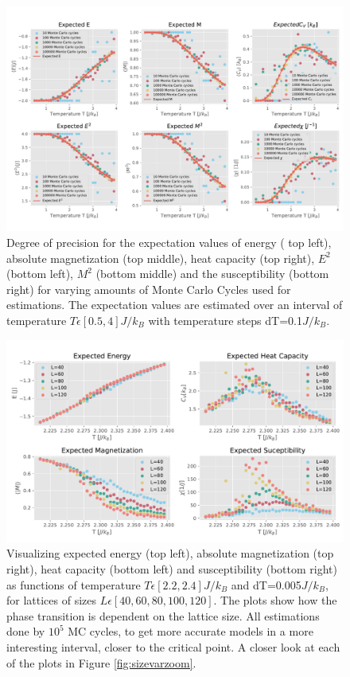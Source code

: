 \documentclass[10pt, nofootinbib, twocolumn]{revtex4-1}
\begin{document}
\begin{figure}\label{fig:all}
    \centering
    \includegraphics[width = 1\textwidth]{figures/mcc_comp_all.pdf} 
    \caption{Degree of precision for the expectation values of energy ( top left), absolute magnetization (top middle), heat capacity (top right), $E^2$ (bottom left), $M^2$ (bottom middle) and the susceptibility (bottom right) for varying amounts of Monte Carlo Cycles used for estimations. The expectation values are estimated over an interval of temperature $T\epsilon [0.5,4]J/k_B$ with temperature steps dT=0.1$J/k_B$.}
    \label{fig:all}
\end{figure} 

\begin{figure}
    \centering
    \includegraphics[width = 1\textwidth]{figures/sizevariationszoom4.pdf} 
    \caption{Visualizing expected energy (top left), absolute magnetization (top right), heat capacity (bottom left) and susceptibility (bottom right) as functions of temperature $T\epsilon [2.2,2.4]J/k_B$ and dT=0.005$J/k_B$, for lattices of sizes $L\epsilon [40, 60, 80, 100, 120]$. The plots show how the phase transition is dependent on the lattice size. All estimations done by $10^5$ MC cycles, to get more accurate models in a more interesting interval, closer to the critical point. A closer look at each of the plots in Figure \ref{fig:sizevarzoom}.}
    \label{fig:closerlook}
\end{figure} 
\end{document}

